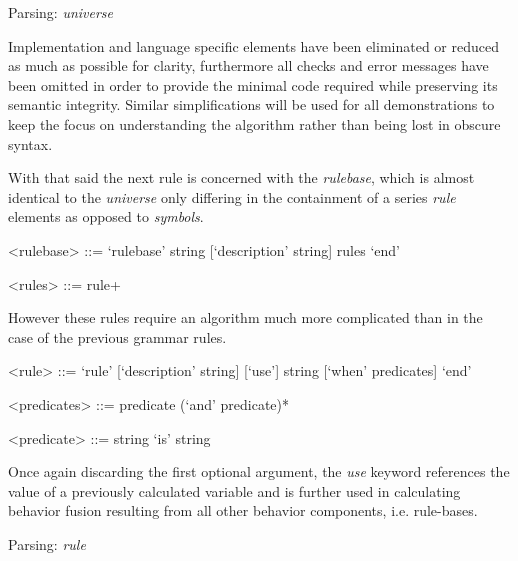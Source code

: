 \begin{algorithm}[H]
\caption{Parsing: \textit{universe}}
\end{algorithm}

Implementation and language specific elements have been eliminated or reduced as much as possible for clarity, furthermore all checks and  error messages have been omitted in order to provide the minimal code required while preserving its semantic integrity. Similar simplifications will be used for all demonstrations to keep the focus on understanding the algorithm rather than being lost in obscure syntax.

With that said the next rule is concerned with the \textit{rulebase}, which is almost identical to the \textit{universe} only differing in the containment of a series \textit{rule} elements as opposed to \textit{symbols}.
\begin{grammar}
<rulebase> ::= `rulebase' string [`description' string] rules `end'

<rules> ::= rule+
\end{grammar}

However these rules require an algorithm much more complicated than in the case of the previous grammar rules.
\begin{grammar}
<rule> ::= `rule' [`description' string] [`use'] string [`when' predicates] `end'

<predicates> ::= predicate (`and' predicate)*

<predicate> ::= string `is' string
\end{grammar}

Once again discarding the first optional argument, the \textit{use} keyword references the value of a previously calculated variable and is further used  in calculating behavior fusion resulting from all other behavior components, i.e. rule-bases.

\begin{algorithm}[H]
\caption{Parsing: \textit{rule}}
\end{algorithm}

